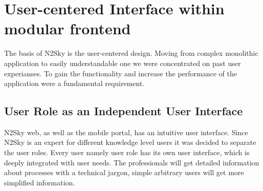 \documentclass[10pt, conference, compsocconf]{IEEEtran}
\begin{document}
\section{User-centered Interface within modular frontend}
\label{User-centered Interface within modular frontend}

The basis of N2Sky is the user-centered design. Moving from complex monolithic application to easily understandable one we were concentrated on past user experianses. To gain the functionality and increase the performance of the application were a fundamental requirement. 

\label{modular_frontend}
\subsection{User Role as an Independent User Interface}
\label{User Role as an Independent User Interface}
N2Sky web, as well as the mobile portal, has an intuitive user interface. Since N2Sky is an expert for different knowledge level users it was decided to separate the user roles. Every user namely user role has its own user interface, which is deeply integrated with user needs. The professionals will get detailed information about processes with a technical jargon, simple arbitrary users will get more simplified information. 
\end{document}
